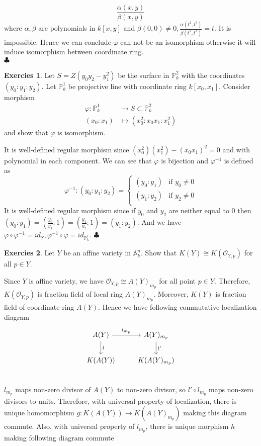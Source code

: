 \documentclass[12pt,a4paper]{article}
\theoremstyle{definition}
\newtheorem{exer}{Exercies}[subsection]
\newcommand*{\qeds}{\hfill\ensuremath{\clubsuit}}
\begin{document}
\[
\frac{\alpha(x,y)}{\beta(x,y)}
\]
where $\alpha ,\beta$ are polynomials in $k[x,y]$ and $\beta(0,0) \neq 0, \frac{\alpha(t^2,t^3)}{\beta(t^2,t^3)} = t$. It is impossible.
Hence we can conclude $\varphi$ can not be an isomorphism otherwise it will induce isomorphism between coordinate ring. \\ \qeds
\begin{exer}
	Let $S= Z(y_0 y_2 - y_1^2)$ be the surface in $\mathbb{P}^2_k$ with the coordinates $(y_0:y_1:y_2)$. Let $\mathbb{P}^1_k$ be projective line with coordinate ring $k[x_0,x_1]$. Consider morphism \[
	\begin{aligned}
	\varphi: \mathbb{P}^1_k &\to S \subset \mathbb{P}^2_k\\
	(x_0:x_1) &\mapsto (x_0^2: x_0x_1: x_1^2)
	\end{aligned}\] and show that $\varphi$ is isomorphism.
\end{exer}
It is well-defined regular morphism since $(x_0^2)(x_1^2) - (x_0 x_1)^2=0$ and with polynomial in each component. We can see that $\varphi$ is bijection and $\varphi^{-1}$ is defined as
\[
\varphi^{-1} \colon (y_0:y_1:y_2) =\begin{cases}
(y_0: y_1)& \text{if } y_0 \neq 0\\
(y_1: y_2)& \text{if } y_2 \neq 0\\
\end{cases} 
\]
It is well-defined regular morphism since if $y_0$ and $y_2$ are neither equal to $0$ then $(y_0: y_1) = (\frac{y_0}{y_1}:1) = (\frac{y_1}{y_2}:1) = (y_1:y_2)$. And we have $\varphi \circ \varphi^{-1} = id_{S}, \varphi^{-1} \circ \varphi = id_{\mathbb{P}^1_k}$. \qeds
\begin{exer}
	Let $Y$ be an affine variety in $\mathbb{A}^n_k$. Show that $K(Y) \cong K(\mathcal{O}_{Y,p})$ for all $p \in Y$.
\end{exer}
Since $Y$ is affine variety, we have $\mathcal{O}_{Y,p} \cong A(Y)_{m_p}$ for all point $p \in Y$. Therefore, $K(\mathcal{O}_{Y,p})$ is fraction field of local ring $A(Y)_{m_p}$. Moreover, $K(Y)$ is fraction field of coordinate ring $A(Y)$. Hence we have following commutative localization diagram
\[
\begin{tikzcd}
A(Y) \ar[r,"l_{m_p}"] \ar[d,"l"] & A(Y)_{m_p} \ar[d,"l'"]\\
K(A(Y)) & K(A(Y)_{m_p})\\
\end{tikzcd}
\]
$l_{m_p}$ maps non-zero divisor of $A(Y)$ to non-zero divisor, so $l' \circ l_{m_p}$ maps non-zero divisors to units. Therefore, with universal property of localization, there is unique homomorphism $g \colon K(A(Y)) \to K(A(Y)_{m_p})$ making this diagram commute. Also, with universal property of $l_{m_p}$, there is unique morphism $h$ making following diagram commute
\end{document}
